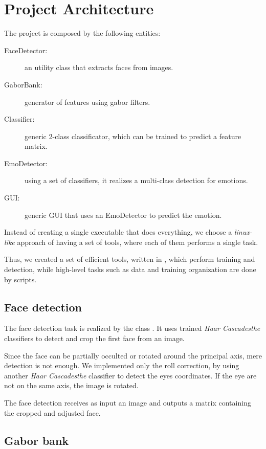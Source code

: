 \section{Project Architecture}

The project is composed by the following entities:

\begin{description}
  \item[FaceDetector:] an utility class that extracts faces from images.
  \item[GaborBank:] generator of features using gabor filters.
  \item[Classifier:] generic 2-class classificator, which can be
    trained to predict a feature matrix.
  \item[EmoDetector:] using a set of classifiers, it realizes a multi-class
    detection for emotions.
  \item[GUI:] generic GUI that uses an EmoDetector to predict the emotion.
\end{description}

Instead of creating a single executable that does everything, we choose a
\emph{linux-like} approach of having a set of tools, where each of them
performs a single task.

Thus, we created a set of efficient tools, written in , which perform
training and detection, while high-level tasks such as data and training
organization are done by  scripts.

\subsection{Face detection}

The face detection task is realized by the class . It uses
trained \emph{Haar Cascadesthe} classifiers to detect and crop the first face
from an image.

Since the face can be partially occulted or rotated around the principal axis,
mere detection is not enough. We implemented only the roll correction, by using
another \emph{Haar Cascadesthe} classifier to detect the eyes coordinates. If
the eye are not on the same axis, the image is rotated.

The face detection receives as input an image and outputs a matrix containing
the cropped and adjusted face.

\subsection{Gabor bank}

